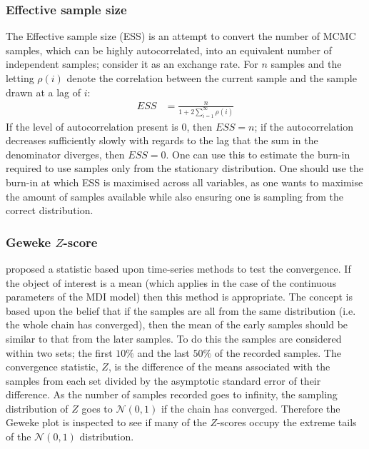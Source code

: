 \documentclass[14pt]{extarticle} %
\begin{document}
	\subsubsection{Effective sample size} \label{sec:additional_theory:sub_sec:convergence:sub_sub_sec:ess}
	The Effective sample size (ESS) \citep{ripley2009stochastic} is an attempt to convert the number of MCMC samples, which can be highly autocorrelated, into an equivalent number of independent samples; consider it as an exchange rate. For $n$ samples and the letting $\rho(i)$ denote the correlation between the current sample and the sample drawn at a lag of $i$:
	\begin{align} \label{eqn:effective_smaple_size}
	ESS &= \frac{n}{1 + 2 \sum_{i=1}^\infty \rho(i)}
	\end{align}
	If the level of autocorrelation present is 0, then $ESS=n$;  if the autocorrelation decreases sufficiently slowly with regards to the lag that the sum in the denominator diverges, then $ESS=0$. One can use this to estimate the burn-in required to use samples only from the stationary distribution. One should use the burn-in at which ESS is maximised across all variables, as one wants to maximise the amount of samples available  while also ensuring one is sampling from the correct distribution.
		
	\subsubsection{Geweke $Z$-score} \label{sec:additional_theory:sub_sec:convergence:sub_sub_sec:geweke}
	\citet{GewekeEvaluatingAccuracySamplingBased} proposed a statistic based upon time-series methods to test the convergence. If the object of interest is a mean (which applies in the case of the continuous parameters of the MDI model) then this method is appropriate. The concept is based upon the belief that if the samples are all from the same distribution (i.e. the whole chain has converged), then the mean of the early samples should be similar to that from the later samples. To do this the samples are considered within two sets; the first $10\%$ and the last $50\%$ of the recorded samples.  The convergence statistic, $Z$, is the difference of the means associated with the samples from each set divided by the asymptotic standard error of their difference. As the number of samples recorded goes to infinity, the sampling distribution of $Z$ goes to $\mathcal{N}(0,1)$ if the chain has converged. Therefore the Geweke plot is inspected to see if many of the $Z$-scores occupy the extreme tails of the $\mathcal{N}(0,1)$ distribution.
	
\end{document}
